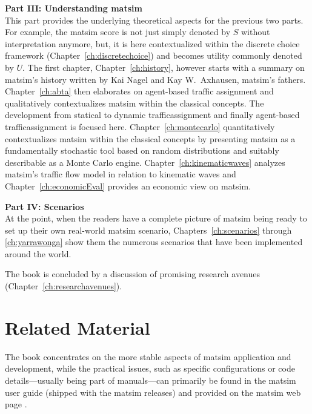 \textbf{Part III: Understanding \acrshort{matsim}} \\
%
This part provides the underlying theoretical aspects for the previous two parts. For example, the \gls{matsim} \gls{score} is not just simply denoted by $S$ without interpretation anymore, but, it is here contextualized within the discrete choice framework (Chapter~\ref{ch:discretechoice}) and becomes \gls{utility} commonly denoted by $U$. 
The first chapter, Chapter~\ref{ch:history}, however starts with a summary on \gls{matsim}'s history written by Kai Nagel and Kay W.\ Axhausen, \gls{matsim}'s fathers. 
Chapter~\ref{ch:abta} then elaborates on agent-based traffic assignment and qualitatively contextualizes \gls{matsim} within the classical concepts. The development from statical to dynamic \gls{trafficassignment} and finally agent-based \gls{trafficassignment} is focused here.  
Chapter~\ref{ch:montecarlo} quantitatively contextualizes \gls{matsim} within the classical concepts by presenting \gls{matsim} as a fundamentally stochastic tool based on random distributions and suitably describable as a Monte Carlo engine.
Chapter~\ref{ch:kinematicwaves} analyzes \gls{matsim}'s traffic flow model in relation to kinematic waves and Chapter~\ref{ch:economicEval} provides an economic view on \gls{matsim}. 

\textbf{Part IV: Scenarios} \\
At the point, when the readers have a complete picture of \gls{matsim} being ready to set up their own real-world \gls{matsim} \gls{scenario}, Chapters~\ref{ch:scenarios} through \ref{ch:yarrawonga} show them the numerous scenarios that have been implemented around the world.

The book is concluded by a discussion of promising research avenues (Chapter~\ref{ch:researchavenues}).

\section*{Related Material}
The book concentrates on the more stable aspects of \gls{matsim} application and development, while the practical issues, such as specific configurations or code details---usually being part of manuals---can primarily be found in the \gls{matsim} user guide (shipped with the \gls{matsim} releases) and provided on the \gls{matsim} web page \citep[][]{MATSim_Userguide_2015}.

